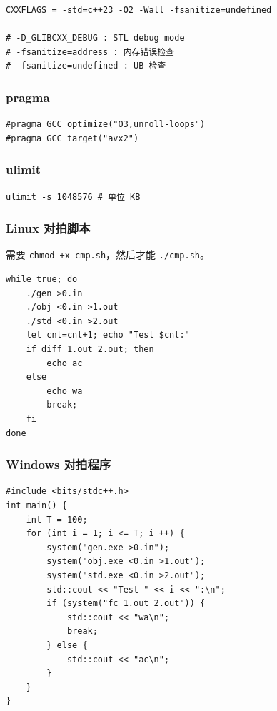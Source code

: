 \begin{verbatim}
CXXFLAGS = -std=c++23 -O2 -Wall -fsanitize=undefined

# -D_GLIBCXX_DEBUG : STL debug mode
# -fsanitize=address : 内存错误检查
# -fsanitize=undefined : UB 检查
\end{verbatim}

\subsubsection{pragma}

\begin{verbatim}
#pragma GCC optimize("O3,unroll-loops")
#pragma GCC target("avx2")
\end{verbatim}

\subsubsection{ulimit}

\begin{verbatim}
ulimit -s 1048576 # 单位 KB
\end{verbatim}

\subsubsection{Linux 对拍脚本}

需要 \texttt{chmod +x cmp.sh}，然后才能 \texttt{./cmp.sh}。

\begin{verbatim}
while true; do
    ./gen >0.in
    ./obj <0.in >1.out
    ./std <0.in >2.out
    let cnt=cnt+1; echo "Test $cnt:"
    if diff 1.out 2.out; then
        echo ac
    else
        echo wa
        break;
    fi
done
\end{verbatim}

\subsubsection{Windows 对拍程序}

\begin{verbatim}
#include <bits/stdc++.h>
int main() {
    int T = 100;
    for (int i = 1; i <= T; i ++) {
        system("gen.exe >0.in");
        system("obj.exe <0.in >1.out");
        system("std.exe <0.in >2.out");
        std::cout << "Test " << i << ":\n";
        if (system("fc 1.out 2.out")) {
            std::cout << "wa\n";
            break;
        } else {
            std::cout << "ac\n";
        }
    }
}
\end{verbatim}

